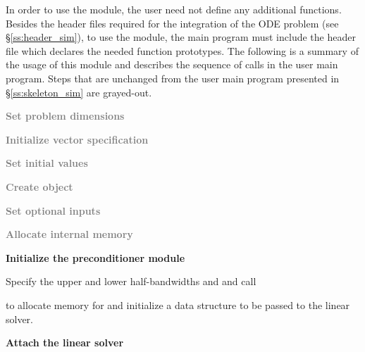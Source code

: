 In order to use the {\cvbandpre} module, the user need not define any
additional functions. 
Besides the header files required for the integration of the ODE problem
(see \S\ref{ss:header_sim}),  to use the {\cvbandpre} module, the main program 
must include the header file  which declares the needed
function prototypes.
The following is a summary of the usage of this module and describes the sequence 
of calls in the user main program. Steps that are unchanged from the user main
program presented in \S\ref{ss:skeleton_sim} are grayed-out.
\begin{Steps}
  
\item
  \textcolor{gray}{\bf Set problem dimensions}

\item
  \textcolor{gray}{\bf Initialize vector specification}

\item
  \textcolor{gray}{\bf Set initial values}
 
\item
  \textcolor{gray}{\bf Create {\cvode} object}

\item
  \textcolor{gray}{\bf Set optional inputs}

\item
  \textcolor{gray}{\bf Allocate internal memory}

\item \label{i:bandpre_init}
  {\bf Initialize the {\cvbandpre} preconditioner module}

  Specify the upper and lower half-bandwidths  and  and call 


  to allocate memory for and initialize a data structure  to be 
  passed to the {\cvspgmr} linear solver.

\item \label{i:bandpre_attach}
  {\bf Attach the {\cvspgmr} linear solver}



\end{Steps}
